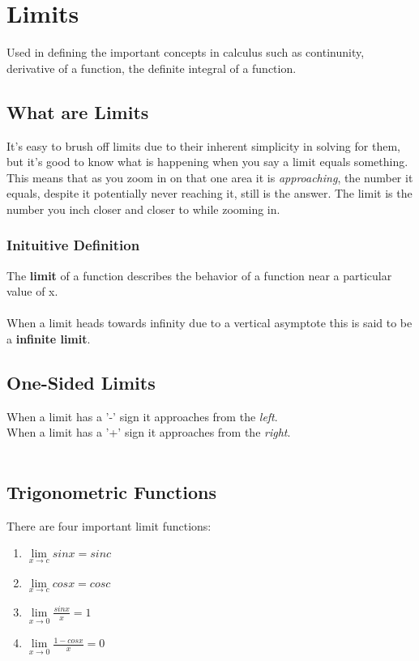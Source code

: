 \chapter{Limits} Used in defining the important concepts in calculus such as continunity, derivative of a function, the definite integral of a function.
\section{What are Limits}
It's easy to brush off limits due to their inherent simplicity in solving for them, but it's good to know what is happening when you say a limit equals something. This means that as you zoom in on that one area it is \textit{approaching}, the number it equals, despite it potentially never reaching it, still is the answer. The limit is the number you inch closer and closer to while zooming in.\\

\subsection{Inituitive Definition}
The \textbf{limit} of a function describes the behavior of a function near a particular value of x.\\
\\
When a limit heads towards infinity due to a vertical asymptote this is said to be a \textbf{infinite limit}.\\

\section{One-Sided Limits}
When a limit has a '-' sign it approaches from the \textit{left}.\\
When a limit has a '+' sign it approaches from the \textit{right}.\\
\\

\section{Trigonometric Functions}
There are four important limit functions:
\begin{enumerate}
\item $\lim\limits_{x \to c} sinx = sinc$\\
\item $\lim\limits_{x \to c} cosx = cosc$\\
\item $\lim\limits_{x \to 0} \frac{sinx}{x} = 1$\\
\item $\lim\limits_{x \to 0} \frac{1-cosx}{x} = 0$
\end{enumerate}
